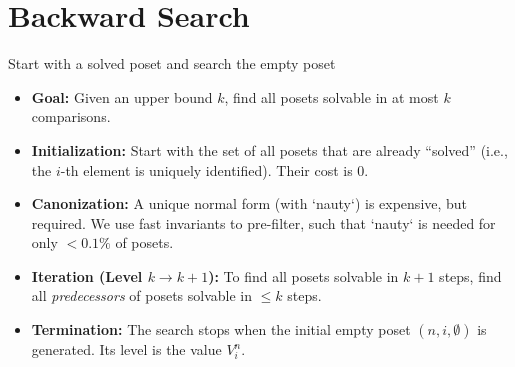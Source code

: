 \author{SEA 2025 \hspace{1cm} Julius von Smercek}

\section{Backward Search}
\sectionframe{\insertsection}

\begin{frame}{\insertsection}
  Start with a solved poset and search the empty poset
  \vfill
  \begin{itemize}
    \item<+-> \textbf{Goal:} Given an upper bound $k$, find all posets solvable in at most $k$ comparisons.
    \item<+-> \textbf{Initialization:} Start with the set of all posets that are already ``solved'' (i.e., the $i$-th element is uniquely identified). Their cost is 0.
    \item<+-> \textbf{Canonization:} A unique normal form (with `nauty`) is expensive, but required. We use fast invariants to pre-filter, such that `nauty` is needed for only $< 0.1\%$ of posets.
    \item<+-> \textbf{Iteration (Level $k \to k+1$):} To find all posets solvable in $k+1$ steps, find all \textit{predecessors} of posets solvable in $\leq k$ steps.
    \item<+-> \textbf{Termination:} The search stops when the initial empty poset $(n, i, \emptyset)$ is generated. Its level is the value $V_i^n$.
  \end{itemize}
\end{frame}
